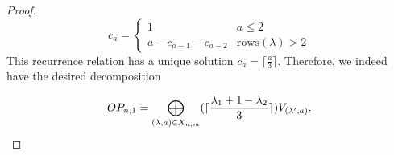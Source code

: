 \documentclass[10pt,a4paper]{amsart}
\begin{document}
\begin{proof}
 $$c_a= \begin{cases} 1 & a\le 2\\
    a- c_{a-1}-c_{a-2} &\text{rows}(\lambda)>2
\end{cases}$$
This recurrence relation has a unique solution $c_a=\lceil \frac{a}{3}\rceil.$  Therefore, we indeed have the desired decomposition

\begin{equation*} OP_{n,1}= \bigoplus_{(\lambda,a)\in X_{n,m}}  (\lceil \frac{\lambda_1 + 1 - \lambda_2}{3} \rceil ) V_{(\lambda',a)}.
\qedhere
\end{equation*}
\end{proof}
\end{document}
